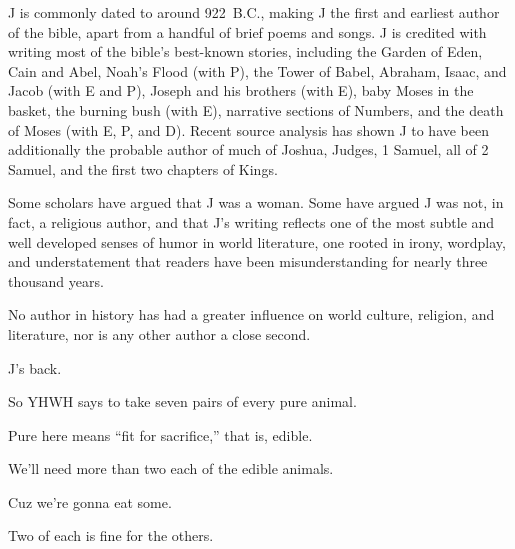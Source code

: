 {\begin{together}[8][5000]
{	J is commonly dated to around 922~B.C., making J the first and earliest
	author of the bible, apart from a handful of brief poems and songs.
	J is credited with writing most of the bible's best-known stories,
	including the Garden of Eden, Cain and Abel, Noah's Flood (with P),
	the Tower of Babel, Abraham, Isaac, and Jacob (with E and P), Joseph
	and his brothers (with E), baby Moses in the basket, the burning bush
	(with E), narrative sections of Numbers, and the death of Moses (with E, P, and D).
	Recent source analysis has shown J to have been additionally the probable
	author of much of Joshua, Judges, 1 Samuel, all of 2 Samuel, and the first
	two chapters of Kings.

	Some scholars have argued that J was a woman.
	Some have argued J was not, in fact, a religious author,
	and that J's writing reflects one of the most subtle and well developed
	senses of humor in world literature, one rooted in irony, wordplay,
	and understatement that readers have been misunderstanding for
	nearly three thousand years.

	No author in history has had a greater influence on world culture,
	religion, and literature, nor is any other author a close second.
	}
	 J's back.
	\end{together}
}

{
}
{
}
{
	So YHWH says to take seven pairs of every pure animal.

	Pure here means ``fit for sacrifice,'' that is, edible.

	We'll need more than two each of the edible animals.

	Cuz we're gonna eat some.

	Two of each is fine for the others.

}

